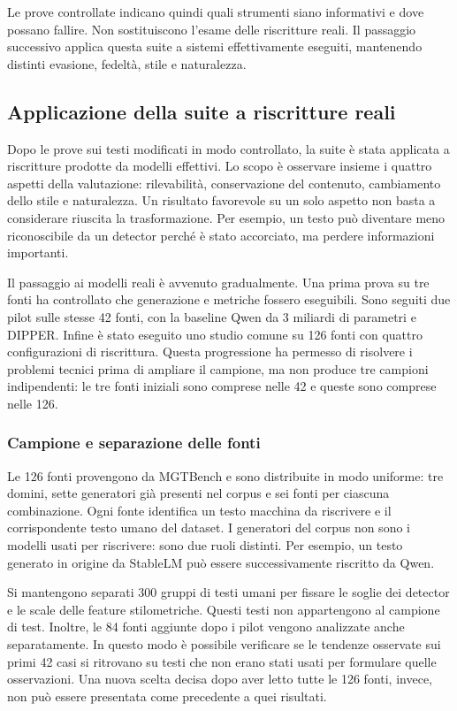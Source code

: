 \documentclass[11pt,a4paper]{article}
\begin{document}
Le prove controllate indicano quindi quali strumenti siano informativi e dove possano fallire. Non sostituiscono l'esame delle riscritture reali. Il passaggio successivo applica questa suite a sistemi effettivamente eseguiti, mantenendo distinti evasione, fedeltà, stile e naturalezza.

\subsection{Applicazione della suite a riscritture reali}\label{applicazione-della-suite-a-riscritture-reali}

Dopo le prove sui testi modificati in modo controllato, la suite è stata applicata a riscritture prodotte da modelli effettivi. Lo scopo è osservare insieme i quattro aspetti della valutazione: rilevabilità, conservazione del contenuto, cambiamento dello stile e naturalezza. Un risultato favorevole su un solo aspetto non basta a considerare riuscita la trasformazione. Per esempio, un testo può diventare meno riconoscibile da un detector perché è stato accorciato, ma perdere informazioni importanti.

Il passaggio ai modelli reali è avvenuto gradualmente. Una prima prova su tre fonti ha controllato che generazione e metriche fossero eseguibili. Sono seguiti due pilot sulle stesse 42 fonti, con la baseline Qwen da 3 miliardi di parametri e DIPPER. Infine è stato eseguito uno studio comune su 126 fonti con quattro configurazioni di riscrittura. Questa progressione ha permesso di risolvere i problemi tecnici prima di ampliare il campione, ma non produce tre campioni indipendenti: le tre fonti iniziali sono comprese nelle 42 e queste sono comprese nelle 126.

\subsubsection{Campione e separazione delle fonti}\label{campione-e-separazione-delle-fonti}

Le 126 fonti provengono da MGTBench e sono distribuite in modo uniforme: tre domini, sette generatori già presenti nel corpus e sei fonti per ciascuna combinazione. Ogni fonte identifica un testo macchina da riscrivere e il corrispondente testo umano del dataset. I generatori del corpus non sono i modelli usati per riscrivere: sono due ruoli distinti. Per esempio, un testo generato in origine da StableLM può essere successivamente riscritto da Qwen.

Si mantengono separati 300 gruppi di testi umani per fissare le soglie dei detector e le scale delle feature stilometriche. Questi testi non appartengono al campione di test. Inoltre, le 84 fonti aggiunte dopo i pilot vengono analizzate anche separatamente. In questo modo è possibile verificare se le tendenze osservate sui primi 42 casi si ritrovano su testi che non erano stati usati per formulare quelle osservazioni. Una nuova scelta decisa dopo aver letto tutte le 126 fonti, invece, non può essere presentata come precedente a quei risultati.
\end{document}
